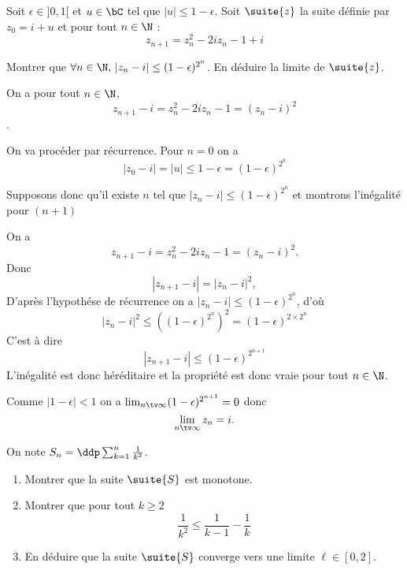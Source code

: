 \documentclass[a4paper, 11pt,reqno]{article}
\begin{document}
\begin{exercice}
Soit $\epsilon\in]0,1[$ et $u\in \bC$ tel que $|u| \leq 1-\epsilon$.
Soit $\suite{z}$ la suite définie par $z_0= i+u$ et pour tout $n\in \N$ :
$$z_{n+1} = z_n^2 -2iz_n-1+i$$

Montrer que $\forall n\in \N,\, |z_n-i|\leq (1-\epsilon)^{2^n}$. En déduire la limite de $\suite{z}$.
\end{exercice}

\begin{correction}
On a pour tout $n\in \N$, 
$$z_{n+1} -i =z_n^2 -2iz_n-1= (z_n-i)^2$$. 

On va procéder par récurrence. Pour $n=0$ on a 
$$|z_0-i |=|u| \leq 1-\epsilon =(1-\epsilon)^{2^0}$$

Supposons donc qu'il existe $n$ tel que $|z_n-i|\leq (1-\epsilon)^{2^n}$  et montrons l'inégalité pour $(n+1)$


On a $$z_{n+1} - i = z_n^2-2iz_n-1 = (z_n -i)^2.$$
Donc 
$$|z_{n+1} - i | =| z_n -i|^2,$$
D'après l'hypothése de récurrence on a 
$| z_n -i| \leq (1-\epsilon)^{2^n}$, d'où
$$| z_n -i|^2 \leq \left((1-\epsilon)^{2^n}\right)^2 =(1-\epsilon)^{2\times 2^{n}}$$
C'est à dire 
$$|z_{n+1} - i | \leq (1-\epsilon)^{2^{n+1}}$$
L'inégalité est donc héréditaire et la propriété est donc vraie pour tout $n\in \N$.

Comme $|1-\epsilon|<1$ on a $\lim_{n\tv \infty}  (1-\epsilon)^{2^{n+1}}=0$ donc 
$$\lim_{n\tv \infty}  z_n = i.$$




\end{correction}

\begin{exercice}
On note $S_n=  \ddp \sum_{k=1}^n \frac{1}{k^2}$.

\begin{enumerate}
\item Montrer que la suite $\suite{S}$  est monotone. 
\item Montrer que pour tout $k\geq 2$
$$\frac{1}{k^2} \leq \frac{1}{k-1}-\frac{1}{k}$$
\item En déduire que la suite $\suite{S}$ converge vers une limite $\ell \in [0,2]$. 
\end{enumerate}
\end{exercice}


\end{document}
